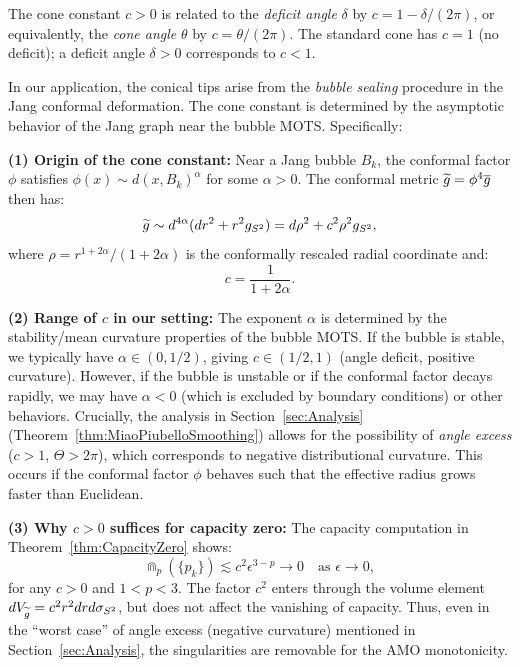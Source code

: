 \begin{remark}\label{rem:ConeAngleSpec}
The cone constant $c > 0$ is related to the \emph{deficit angle} $\delta$ by $c = 1 - \delta/(2\pi)$, or equivalently, the \emph{cone angle} $\theta$ by $c = \theta/(2\pi)$. The standard cone has $c = 1$ (no deficit); a deficit angle $\delta > 0$ corresponds to $c < 1$.

In our application, the conical tips arise from the \emph{bubble sealing} procedure in the Jang conformal deformation. The cone constant is determined by the asymptotic behavior of the Jang graph near the bubble MOTS. Specifically:

\textbf{(1) Origin of the cone constant:}
Near a Jang bubble $B_k$, the conformal factor $\phi$ satisfies $\phi(x) \sim d(x, B_k)^\alpha$ for some $\alpha > 0$. The conformal metric $\widetilde{g} = \phi^4 \overline{g}$ then has:
\begin{equation}
    \widetilde{g} \sim d^{4\alpha} (dr^2 + r^2 g_{S^2}) = d\rho^2 + c^2 \rho^2 g_{S^2},
\end{equation}
where $\rho = r^{1+2\alpha}/(1+2\alpha)$ is the conformally rescaled radial coordinate and:
\begin{equation}
    c = \frac{1}{1 + 2\alpha}.
\end{equation}

\textbf{(2) Range of $c$ in our setting:}
The exponent $\alpha$ is determined by the stability/mean curvature properties of the bubble MOTS.
If the bubble is stable, we typically have $\alpha \in (0, 1/2)$, giving $c \in (1/2, 1)$ (angle deficit, positive curvature).
However, if the bubble is unstable or if the conformal factor decays rapidly, we may have $\alpha < 0$ (which is excluded by boundary conditions) or other behaviors.
Crucially, the analysis in Section~\ref{sec:Analysis} (Theorem~\ref{thm:MiaoPiubelloSmoothing}) allows for the possibility of \emph{angle excess} ($c > 1$, $\Theta > 2\pi$), which corresponds to negative distributional curvature.
This occurs if the conformal factor $\phi$ behaves such that the effective radius grows faster than Euclidean.

\textbf{(3) Why $c > 0$ suffices for capacity zero:}
The capacity computation in Theorem~\ref{thm:CapacityZero} shows:
\begin{equation}
    \Cap_p(\{p_k\}) \lesssim c^2 \epsilon^{3-p} \to 0 \quad \text{as } \epsilon \to 0,
\end{equation}
for any $c > 0$ and $1 < p < 3$. The factor $c^2$ enters through the volume element $dV_{\widetilde{g}} = c^2 r^2 dr d\sigma_{S^2}$, but does not affect the vanishing of capacity.
Thus, even in the ``worst case'' of angle excess (negative curvature) mentioned in Section~\ref{sec:Analysis}, the singularities are removable for the AMO monotonicity.


\end{remark}
